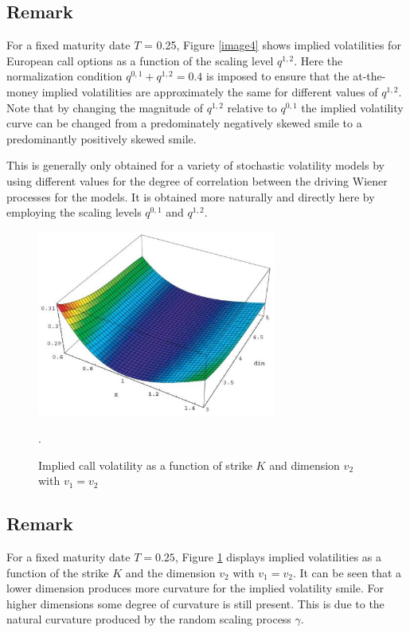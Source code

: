 \documentclass[a4 paper, 12pt]{report}
\theoremstyle{plain}
\begin{document}
\subsection*{Remark}
\noindent
\par For a fixed maturity date $T$ = 0.25, Figure \ref{image4} shows implied volatilities for European call options as a function of the scaling level $q^{1,2}$. Here the normalization condition $q^{0,1}+q^{1,2} = 0.4$ is imposed to ensure that the at-the-money implied volatilities are approximately the same for different values of $q^{1,2}$. Note that by changing the magnitude of $q^{1,2}$ relative to $q^{0,1}$ the implied volatility curve can be changed from a predominately negatively skewed smile to a predominantly positively skewed smile.

This is generally only obtained for a variety of stochastic volatility models by using different values for the degree of correlation between the driving Wiener processes for the models. It is obtained more naturally and directly here by employing the %
scaling levels $q^{0,1}$ and $q^{1,2}$.

\begin{figure}[hp]
	\centering
		\includegraphics[width=0.70\textwidth]{fig3.JPG}
	\label{image3}
	\caption{Implied call volatility as a function of strike $K$ and dimension $v_2$ with $v_1 = v_2$}.
\end{figure}

\subsection*{Remark}
\noindent
\par For a fixed maturity date $T = 0.25$, Figure \ref{image3} displays implied volatilities as a
function of the strike $K$ and the dimension $v_2$ with $v_1 = v_2$. It can be seen that a
lower dimension produces more curvature for the implied volatility smile. For
higher dimensions some degree of curvature is still present. This is due to the
natural curvature produced by the random scaling process $\gamma$. 
\end{document}
